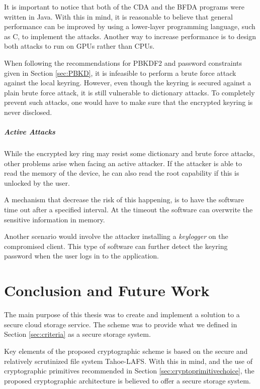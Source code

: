 \documentclass[pdftex,english,10pt,b5paper,twoside]{book}
\begin{document}
It is important to notice that both of the \ac{CDA} and the \ac{BFDA} programs
were written in Java. With this in mind, it is reasonable to believe that
general performance can be improved by using a lower-layer programming
language, such as C, to implement the attacks. Another way to increase
performance is to design both attacks to run on \acp{GPU} rather than
\acp{CPU}.

When following the recommendations for \ac{PBKDF2} and password constraints
given in Section \ref{sec:PBKD}, it is infeasible to perform a brute force
attack against the local keyring. However, even though the keyring is secured
against a plain brute force attack, it is still vulnerable to dictionary
attacks. To completely prevent such attacks, one would have to make sure that
the encrypted keyring is never disclosed.

\paragraph{Active Attacks}

While the encrypted key ring may resist some dictionary and brute force
attacks, other problems arise when facing an active attacker. If the attacker
is able to read the memory of the device, he can also read the root capability
if this is unlocked by the user. 

A mechanism that decrease the risk of this happening, is to have the software
time out after a specified interval. At the timeout the software can overwrite
the sensitive information in memory.

Another scenario would involve the attacker installing a \emph{keylogger} on
the compromised client. This type of software can further detect the keyring
password when the user logs in to the application.

\chapter{Conclusion and Future Work}
\label{ch:conclusion}

The main purpose of this thesis was to create and implement a solution to a
secure cloud storage service. The scheme was to provide what we defined in
Section \ref{sec:criteria} as a secure storage system. 

Key elements of the proposed cryptographic scheme is based on the secure and
relatively scrutinized file system Tahoe-\ac{LAFS}. With this in mind, and the
use of cryptographic primitives recommended in Section
\ref{sec:cryptoprimitivechoice}, the proposed cryptographic architecture is
believed to offer a secure storage system. 
\end{document}
